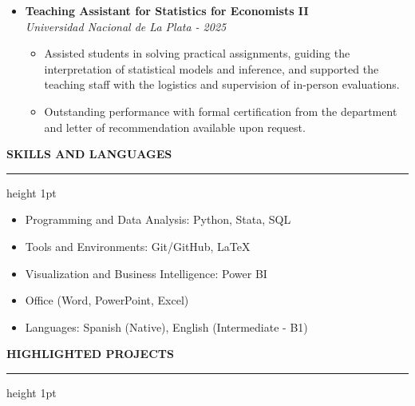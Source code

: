 \documentclass[11pt, a4paper]{article}
\begin{document}
\begin{itemize}[label=\small$\bullet$, leftmargin=1.4em, itemsep=0.8em]
\color{darktext}
    \item {\large \textbf{Teaching Assistant for Statistics for Economists II}}\\
    {\color{subtext}\textit{Universidad Nacional de La Plata - 2025}}
    \begin{itemize}[label=\tiny$\bullet$]
        \item {\large \color{subtext} Assisted students in solving practical assignments, guiding the interpretation of statistical models and inference, and supported the teaching staff with the logistics and supervision of in-person evaluations.}
        \item {\large \color{subtext} Outstanding performance with formal certification from the department and letter of recommendation available upon request.}
    \end{itemize}

\end{itemize}

\vspace{1.0em}



{\Large \color{darktext} \bfseries \faPuzzlePiece\hspace{0.5em} SKILLS AND LANGUAGES}
\vspace{0.4em}
\hrule height 1pt \color{linecolor}
\vspace{0.2em}

\begin{itemize}[label=\small$\bullet$, leftmargin=1.4em, itemsep=5pt]
    \color{darktext}
    \item {\large Programming and Data Analysis: Python, Stata, SQL}
    \item {\large Tools and Environments: Git/GitHub, LaTeX}
    \item {\large Visualization and Business Intelligence: Power BI}    
    \item {\large Office (Word, PowerPoint, Excel)}
    \item {\large Languages: Spanish (Native), English (Intermediate - B1)}
\end{itemize}

\vspace{1.5em}


{\Large \color{darktext} \bfseries \faGlobe\hspace{0.5em} HIGHLIGHTED PROJECTS}
\vspace{0.4em}
\hrule height 1pt \color{linecolor}
\vspace{0.2em}
\end{document}
